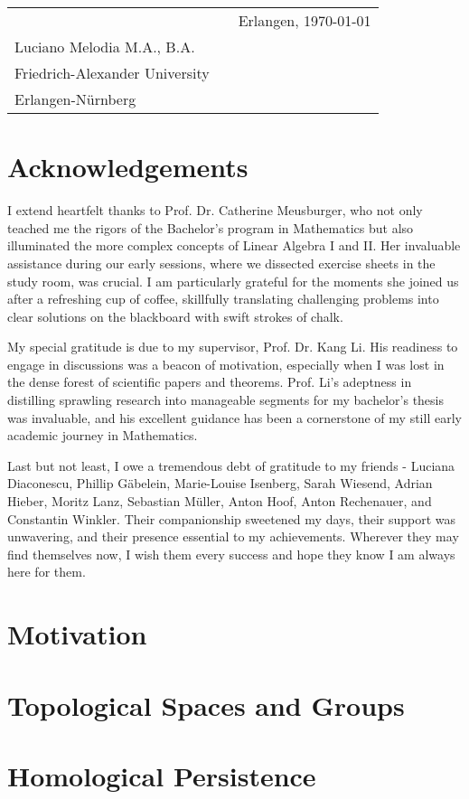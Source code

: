 \documentclass[b5paper, 12pt, twoside]{report}
\begin{document}
	\vspace{2cm}
	\begin{tabular}{@{}p{3.5in}p{2in}p{2in}@{}}
		\hrulefill                                      &  & Erlangen, \today \\
		Luciano Melodia M.A., B.A.                      &  &                  \\
		Friedrich-Alexander University\\
		Erlangen-Nürnberg
	\end{tabular}

	\chapter*{Acknowledgements}

	I extend heartfelt thanks to Prof. Dr. Catherine Meusburger, who not only teached me the rigors of the Bachelor's program in Mathematics but also illuminated the more complex concepts of Linear Algebra I and II. Her invaluable assistance during our early sessions, where we dissected exercise sheets in the study room, was crucial. I am particularly grateful for the moments she joined us after a refreshing cup of coffee, skillfully translating challenging problems into clear solutions on the blackboard with swift strokes of chalk. 

My special gratitude is due to my supervisor, Prof. Dr. Kang Li. His readiness to engage in discussions was a beacon of motivation, especially when I was lost in the dense forest of scientific papers and theorems. Prof. Li's adeptness in distilling sprawling research into manageable segments for my bachelor's thesis was invaluable, and his excellent guidance has been a cornerstone of my still early academic journey in Mathematics.

Last but not least, I owe a tremendous debt of gratitude to my friends - Luciana Diaconescu, Phillip Gäbelein, Marie-Louise Isenberg, Sarah Wiesend, Adrian Hieber, Moritz Lanz, Sebastian Müller, Anton Hoof, Anton Rechenauer, and Constantin Winkler. Their companionship sweetened my days, their support was unwavering, and their presence essential to my achievements. Wherever they may find themselves now, I wish them every success and hope they know I am always here for them.

	\newpage
	\tableofcontents

	\singlespacing
	\chapter{Motivation}
	

	\chapter{Topological Spaces and Groups}
	

	\chapter{Homological Persistence}
	

	\singlespacing
	\printbibliography

	\newpage
	\printindex
\end{document}

